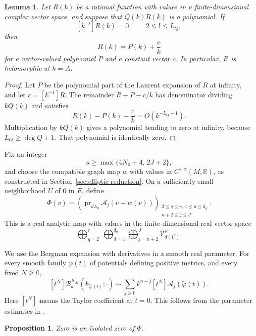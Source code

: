 \documentclass[11pt,reqno]{amsart}
\newtheorem{lemma}[theorem]{Lemma}
\theoremstyle{corollary}
\theoremstyle{conjecture}
\theoremstyle{assumption}
\theoremstyle{proposition}
\newtheorem{proposition}[theorem]{Proposition}
\theoremstyle{remark}
\numberwithin{equation}{section}
\begin{document}
\begin{lemma}\label{lem:finite-laurent-vanishing}
Let $R(k)$ be a rational function with values in a finite-dimensional complex vector space, and suppose that $Q(k)R(k)$ is a polynomial. If
\[
[k^{-l}]R(k)=0,\qquad 2\leq l\leq L_Q,
\]
then
\[
R(k)=P(k)+\frac{c}{k}
\]
for a vector-valued polynomial $P$ and a constant vector $c$. In particular, $R$ is holomorphic at $k=A$.
\end{lemma}

\begin{proof}
Let $P$ be the polynomial part of the Laurent expansion of $R$ at infinity, and let $c=[k^{-1}]R$. The remainder $R-P-c/k$ has denominator dividing $kQ(k)$ and satisfies
\[
R(k)-P(k)-\frac{c}{k}=O(k^{-L_Q-1}).
\]
Multiplication by $kQ(k)$ gives a polynomial tending to zero at infinity, because $L_Q\geq\deg Q+1$. That polynomial is identically zero.
\end{proof}

Fix an integer
\begin{equation}\label{eq:even-regularity}
s\geq\max\{4N_0+4,\,2J+2\},
\end{equation}
and choose the compatible graph map $w$ with values in $C^{s,\alpha}(M,\mathbb R)$, as constructed in Section~\ref{sec:elliptic-reduction}.
On a sufficiently small neighborhood $U$ of $0$ in $E$, define
\begin{equation}\label{eq:finite-projected-equations}
\Phi(v)=\left(\operatorname{pr}_{d\Lambda_q}\mathcal A_j(v+w(v))\right)_{\substack{2\leq q\leq r,\ 1\leq d\leq d_q\\n+2\leq j\leq J}}.
\end{equation}
This is a real-analytic map with values in the finite-dimensional real vector space
\[
\bigoplus_{q=2}^r\ \bigoplus_{d=1}^{d_q}\bigoplus_{j=n+2}^{J}\mathcal V_{d(1^q)}^{\mathbb R}.
\]

We use the Bergman expansion with derivatives in a smooth real parameter. For every smooth family $\widetilde\varphi(t)$ of potentials defining positive metrics, and every fixed $N\geq 0$,
\begin{equation}\label{eq:finite-order-bergman-expansion}
[t^N]\mathcal B_k^{K_M}(h_{\widetilde\varphi(t)};\cdot)\sim\sum_{j\geq 0}k^{n-j}[t^N]\mathcal A_j(\widetilde\varphi(t)).
\end{equation}
Here $[t^N]$ means the Taylor coefficient at $t=0$. This follows from the parameter estimates in \cite[Theorems~1.1 and~1.3]{DaiLiuMa2006}.

\begin{proposition}\label{prop:isolated-projected-zero}
Zero is an isolated zero of $\Phi$.
\end{proposition}
\end{document}
